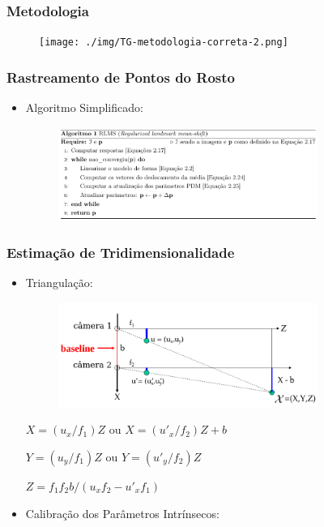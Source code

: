 \documentclass[brazil]{beamer}
\begin{document}
\begin{frame}
	\frametitle{Metodologia}
      \begin{figure}
        \centering
        \texttt{[image: ./img/TG-metodologia-correta-2.png]}
      \end{figure}   
          
\end{frame}

\begin{frame}
\frametitle{Rastreamento de Pontos do Rosto}
  \begin{itemize}
      \item Algoritmo Simplificado:   
          \begin{figure}
        \centering
        \includegraphics[width = 0.8\textwidth, keepaspectratio]{./img/algorithm.png}
      \end{figure}
  \end{itemize} 
\end{frame}

\begin{frame}
\frametitle{Estimação de Tridimensionalidade}
  \begin{itemize}
      \item Triangulação:
      
      \begin{figure}
        \centering
        \includegraphics[width = 0.8\textwidth, keepaspectratio]{./img/TG_triangulation_pdf_washington_pt2.png}
      \end{figure}
      
      $X = (u_x/f_1)  Z$ ou $ X = (u'_x/f_2)  Z + b $
      
      $Y = (u_y/f_1) Z$ ou $ Y = (u'_y/f_2) Z$
      
      $Z = f_1  f_2  b / (u_x  f_2 - u'_x  f_1)$
      
      \item Calibração dos Parâmetros Intrínsecos:
  \end{itemize} 
\end{frame}
\end{document}
